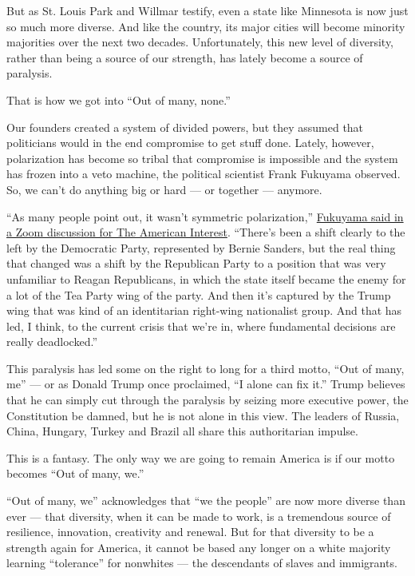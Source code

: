 But as St. Louis Park and Willmar testify, even a state like Minnesota
is now just so much more diverse. And like the country, its major cities
will become minority majorities over the next two decades.
Unfortunately, this new level of diversity, rather than being a source
of our strength, has lately become a source of paralysis.

That is how we got into ``Out of many, none.''

Our founders created a system of divided powers, but they assumed that
politicians would in the end compromise to get stuff done. Lately,
however, polarization has become so tribal that compromise is impossible
and the system has frozen into a veto machine, the political scientist
Frank Fukuyama observed. So, we can't do anything big or hard --- or
together --- anymore.

``As many people point out, it wasn't symmetric polarization,''
\href{https://www.the-american-interest.com/2020/05/13/political-decay-in-the-time-of-coronavirus/}{Fukuyama
said in a Zoom discussion for The American Interest}. ``There's been a
shift clearly to the left by the Democratic Party, represented by Bernie
Sanders, but the real thing that changed was a shift by the Republican
Party to a position that was very unfamiliar to Reagan Republicans, in
which the state itself became the enemy for a lot of the Tea Party wing
of the party. And then it's captured by the Trump wing that was kind of
an identitarian right-wing nationalist group. And that has led, I think,
to the current crisis that we're in, where fundamental decisions are
really deadlocked.''

This paralysis has led some on the right to long for a third motto,
``Out of many, me'' --- or as Donald Trump once proclaimed, ``I alone
can fix it.'' Trump believes that he can simply cut through the
paralysis by seizing more executive power, the Constitution be damned,
but he is not alone in this view. The leaders of Russia, China, Hungary,
Turkey and Brazil all share this authoritarian impulse.

This is a fantasy. The only way we are going to remain America is if our
motto becomes ``Out of many, we.''

``Out of many, we'' acknowledges that ``we the people'' are now more
diverse than ever --- that diversity, when it can be made to work, is a
tremendous source of resilience, innovation, creativity and renewal. But
for that diversity to be a strength again for America, it cannot be
based any longer on a white majority learning ``tolerance'' for
nonwhites --- the descendants of slaves and immigrants.

